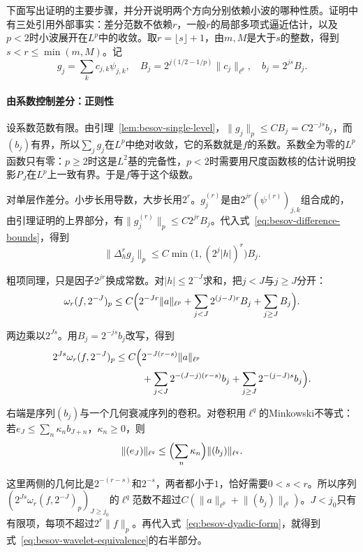下面写出证明的主要步骤，并分开说明两个方向分别依赖小波的哪种性质。证明中有三处引用外部事实：差分范数不依赖$r$，一般$r$的局部多项式逼近估计，以及$p<2$时小波展开在$L^p$中的收敛。取$r=\lfloor s\rfloor+1$，由$m,M$是大于$s$的整数，得到$s<r\leq\min(m,M)$。记
\[
 g_j=\sum_kc_{j,k}\psi_{j,k},\quad B_j=2^{j(1/2-1/p)}\lVert c_j\rVert_{\ell^p},\quad b_j=2^{js}B_j .
\]

\paragraph{由系数控制差分：正则性}
设系数范数有限。由引理~\ref{lem:besov-single-level}，$\lVert g_j\rVert_p\leq CB_j=C2^{-js}b_j$，而$(b_j)$有界，所以$\sum_jg_j$在$L^p$中绝对收敛，它的系数就是$f$的系数。系数全为零的$L^p$函数只有零：$p\geq2$时这是$L^2$基的完备性，$p<2$时需要用尺度函数核的估计说明投影$P_J$在$L^p$上一致有界。于是$f$等于这个级数。

对单层作差分。小步长用导数，大步长用$2^r$。$g_j^{(r)}$是由$2^{jr}(\psi^{(r)})_{j,k}$组合成的，由引理证明的上界部分，有$\lVert g_j^{(r)}\rVert_p\leq C2^{jr}B_j$。代入式~\eqref{eq:besov-difference-bounds}，得到
\[
 \lVert\Delta_h^rg_j\rVert_p\leq C\min\bigl(1,(2^j\lvert h\rvert)^r\bigr)B_j .
\]

粗项同理，只是因子$2^{jr}$换成常数。对$\lvert h\rvert\leq2^{-J}$求和，把$j<J$与$j\geq J$分开：
\[
 \omega_r(f,2^{-J})_p\leq C\Bigl(2^{-Jr}\lVert a\rVert_{\ell^p}+\sum_{j<J}2^{(j-J)r}B_j+\sum_{j\geq J}B_j\Bigr).
\]

两边乘以$2^{Js}$。用$B_j=2^{-js}b_j$改写，得到
\[
 \begin{aligned}
 2^{Js}\omega_r(f,2^{-J})_p\leq C\Bigl(&2^{-J(r-s)}\lVert a\rVert_{\ell^p}\\
 &+\sum_{j<J}2^{-(J-j)(r-s)}b_j+\sum_{j\geq J}2^{-(j-J)s}b_j\Bigr).
 \end{aligned}
\]

右端是序列$(b_j)$与一个几何衰减序列的卷积。对卷积用$\ell^q$的Minkowski不等式：若$e_J\leq\sum_n\kappa_nb_{J+n}$，$\kappa_n\geq0$，则
\begin{equation}
 \lVert(e_J)\rVert_{\ell^q}\leq\Bigl(\sum_n\kappa_n\Bigr)\lVert(b_j)\rVert_{\ell^q}.
 \label{eq:besov-convolution}
\end{equation}

这里两侧的几何比是$2^{-(r-s)}$和$2^{-s}$，两者都小于$1$，恰好需要$0<s<r$。所以序列$(2^{Js}\omega_r(f,2^{-J})_p)_{J\geq j_0}$的$\ell^q$范数不超过$C(\lVert a\rVert_{\ell^p}+\lVert(b_j)\rVert_{\ell^q})$。$J<j_0$只有有限项，每项不超过$2^r\lVert f\rVert_p$。再代入式~\eqref{eq:besov-dyadic-form}，就得到式~\eqref{eq:besov-wavelet-equivalence}的右半部分。

